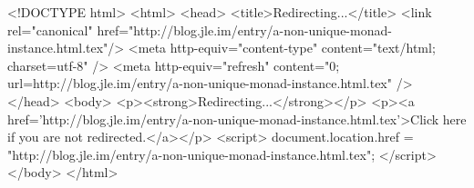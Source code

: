 <!DOCTYPE html>
<html>
<head>
<title>Redirecting...</title>
<link rel="canonical" href="http://blog.jle.im/entry/a-non-unique-monad-instance.html.tex"/>
<meta http-equiv="content-type" content="text/html; charset=utf-8" />
<meta http-equiv="refresh" content="0; url=http://blog.jle.im/entry/a-non-unique-monad-instance.html.tex" />
</head>
<body>
  <p><strong>Redirecting...</strong></p>
  <p><a href='http://blog.jle.im/entry/a-non-unique-monad-instance.html.tex'>Click here if you are not redirected.</a></p>
  <script>
    document.location.href = "http://blog.jle.im/entry/a-non-unique-monad-instance.html.tex";
  </script>
</body>
</html>
